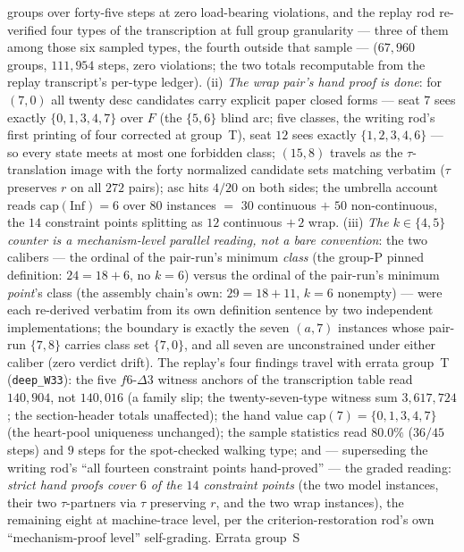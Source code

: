 groups over forty-five steps at zero load-bearing violations, and the
replay rod re-verified four types of the transcription at full group
granularity --- three of them among those six sampled types, the fourth
outside that sample --- ($67{,}960$ groups, $111{,}954$ steps, zero
violations; the two totals recomputable from the replay transcript's
per-type ledger). \textup{(ii)}
\emph{The wrap pair's hand proof is done}: for $(7,0)$ all twenty desc
candidates carry explicit paper closed forms --- seat $7$ sees exactly
$\{0,1,3,4,7\}$ over $F$ (the $\{5,6\}$ blind arc; five classes, the
writing rod's first printing of four corrected at group~T), seat $12$ sees
exactly $\{1,2,3,4,6\}$ --- so every state meets at most one forbidden
class; $(15,8)$ travels as the $\tau$-translation image with the forty
normalized candidate sets matching verbatim ($\tau$ preserves $r$ on all
$272$ pairs); asc hits $4/20$ on both sides; the umbrella account reads
$\mathrm{cap}(\mathrm{Inf})=6$ over $80$ instances $=$ $30$ continuous
$+$ $50$ non-continuous, the $14$ constraint points splitting as
$12$ continuous $+\,2$ wrap. \textup{(iii)} \emph{The $k\in\{4,5\}$
counter is a mechanism-level parallel reading, not a bare convention}: the
two calibers --- the ordinal of the pair-run's minimum \emph{class} (the
group-P pinned definition: $24=18+6$, no $k=6$) versus the ordinal of the
pair-run's minimum \emph{point}'s class (the assembly chain's own:
$29=18+11$, $k=6$ nonempty) --- were each re-derived verbatim from its
own definition sentence by two independent implementations; the boundary
is exactly the seven $(a,7)$ instances whose pair-run $\{7,8\}$ carries
class set $\{7,0\}$, and all seven are unconstrained under either caliber
(zero verdict drift). The replay's four findings travel with errata
group~T (\texttt{deep\_W33}): the five $f6$-$\Delta3$ witness anchors of
the transcription table read $140{,}904$, not $140{,}016$ (a family slip;
the twenty-seven-type witness sum $3{,}617{,}724$; the section-header
totals unaffected); the hand value $\mathrm{cap}(7)=\{0,1,3,4,7\}$ (the
heart-pool uniqueness unchanged); the sample statistics read $80.0\%$
($36/45$ steps) and $9$ steps for the spot-checked walking type; and ---
superseding the writing rod's ``all fourteen constraint points
hand-proved'' --- the graded reading: \emph{strict hand proofs cover $6$
of the $14$ constraint points} (the two model instances, their two
$\tau$-partners via $\tau$ preserving $r$, and the two wrap instances),
the remaining eight at machine-trace level, per the criterion-restoration
rod's own ``mechanism-proof level'' self-grading. Errata group~S
